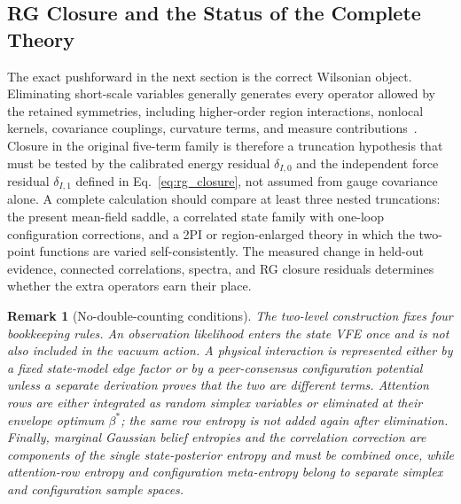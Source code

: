 \documentclass[11pt]{article}
\newtheorem{remark}{Remark}
\begin{document}
\subsection{RG Closure and the Status of the Complete Theory}

The exact pushforward in the next section is the correct Wilsonian object. Eliminating short-scale variables generally generates every operator allowed by the retained symmetries, including higher-order region interactions, nonlocal kernels, covariance couplings, curvature terms, and measure contributions~\cite{Wilson1974}. Closure in the original five-term family is therefore a truncation hypothesis that must be tested by the calibrated energy residual $\delta_{I,0}$ and the independent force residual $\delta_{I,1}$ defined in Eq.~\eqref{eq:rg_closure}, not assumed from gauge covariance alone. A complete calculation should compare at least three nested truncations: the present mean-field saddle, a correlated state family with one-loop configuration corrections, and a 2PI or region-enlarged theory in which the two-point functions are varied self-consistently. The measured change in held-out evidence, connected correlations, spectra, and RG closure residuals determines whether the extra operators earn their place.

\begin{remark}[No-double-counting conditions]
\label{rem:beyond_mf_no_double_counting}
The two-level construction fixes four bookkeeping rules. An observation likelihood enters the state VFE once and is not also included in the vacuum action. A physical interaction is represented either by a fixed state-model edge factor or by a peer-consensus configuration potential unless a separate derivation proves that the two are different terms. Attention rows are either integrated as random simplex variables or eliminated at their envelope optimum $\beta^*$; the same row entropy is not added again after elimination. Finally, marginal Gaussian belief entropies and the correlation correction are components of the single state-posterior entropy and must be combined once, while attention-row entropy and configuration meta-entropy belong to separate simplex and configuration sample spaces.
\end{remark}
\end{document}
